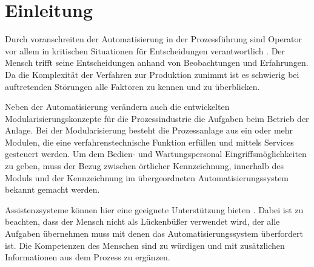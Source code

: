 
\chapter{Einleitung}
\label{sec:Einleitung}

Durch voranschreiten der Automatisierung in der Prozessführung sind Operator vor allem in kritischen Situationen für Entscheidungen verantwortlich \cite{Bainbridge1983}. Der Mensch trifft seine Entscheidungen anhand von Beobachtungen und Erfahrungen. Da die Komplexität der Verfahren zur Produktion zunimmt ist es schwierig bei auftretenden Störungen alle Faktoren zu kennen und zu überblicken. 

Neben der Automatisierung verändern auch die entwickelten Modularisierungskonzepte für die Prozessindustrie die Aufgaben beim Betrieb der Anlage. Bei der Modularisierung besteht die Prozessanlage aus ein oder mehr Modulen, die eine verfahrenstechnische Funktion erfüllen und mittels Services gesteuert werden. \glqq Um dem Bedien- und Wartungspersonal Eingriffsmöglichkeiten zu geben, muss der Bezug zwischen örtlicher Kennzeichnung, innerhalb des Moduls und der Kennzeichnung im übergeordneten Automatisierungssystem bekannt gemacht werden.\grqq \ \cite{Obst2013} 

Assistenzsysteme können hier eine geeignete Unterstützung bieten \cite{Dalgleish2007} . Dabei ist zu beachten, dass der Mensch nicht als Lückenbüßer verwendet wird, der alle Aufgaben übernehmen muss mit denen das Automatisierungssystem überfordert ist. Die Kompetenzen des Menschen sind zu würdigen und mit zusätzlichen Informationen aus dem Prozess zu ergänzen. \cite{Weisner2018}



